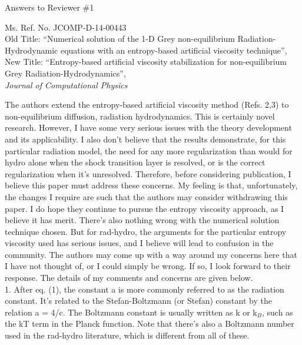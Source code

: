 \documentclass{article}
\begin{document}
\begin{center}
{ \Large Answers to Reviewer \#1}
\end{center}

\bigskip

\noindent Ms. Ref. No. JCOMP-D-14-00443\\
Old Title: ``Numerical solution of the 1-D Grey non-equilibrium Radiation-Hydrodynamic equations with an entropy-based artificial viscosity technique'', \\
New Title: ``Entropy-based artificial viscosity stabilization for non-equilibrium Grey Radiation-Hydrodynamics'',\\
{\it Journal of Computational Physics}\\

\bigskip
\bigskip

{
\color{blue}
The authors extend the entropy-based artificial viscosity method (Refs. 2,3) to non-equilibrium diffusion, radiation hydrodynamics. This is certainly novel research. However, I have some very serious issues with the theory development and its applicability. I also don't believe that the results demonstrate, for this particular radiation model, the need for any more regularization than would for hydro alone when the shock transition layer is resolved, or is the correct regularization when it's unresolved. Therefore, before considering publication, I believe this paper must address these concerns.
My feeling is that, unfortunately, the changes I require are such that the authors may consider withdrawing this paper. I do hope they continue to pursue the entropy viscosity approach, as I believe it has merit. There's also nothing wrong with the numerical solution technique chosen. But for rad-hydro, the arguments for the particular entropy viscosity used has serious issues, and I believe will lead to confusion in the community. The authors may come up with a way around my concerns here that I have not thought of, or I could simply be wrong. If so, I look forward to their response.
The details of my comments and concerns are given below.\\

1. After eq. (1), the constant a is more commonly referred to as the radiation constant. It's related to the Stefan-Boltzmann (or Stefan) constant by the relation a = 4/c. The Boltzmann constant is usually written as k or k$_B$, such as the kT term in the Planck function. Note that there's also a Boltzmann number used in the rad-hydro literature, which is different from all of these.
}
\end{document}
